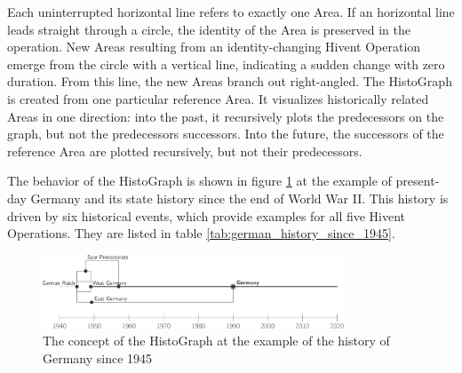 \vspace{-2em}

Each uninterrupted horizontal line refers to exactly one Area. If an horizontal line leads straight through a circle, the identity of the Area is preserved in the operation. New Areas resulting from an identity-changing Hivent Operation emerge from the circle with a vertical line, indicating a sudden change with zero duration. From this line, the new Areas branch out right-angled. The HistoGraph is created from one particular reference Area. It visualizes historically related Areas in one direction: into the past, it recursively plots the predecessors on the graph, but not the predecessors successors. Into the future, the successors of the reference Area are plotted recursively, but not their predecessors.

The behavior of the HistoGraph is shown in figure \ref{fig:example_germany} at the example of present-day Germany and its state history since the end of World War II. This history is driven by six historical events, which provide examples for all five Hivent Operations. They are listed in table \ref{tab:german_history_since_1945}.

\begin{figure}[ht]
  \vspace{0.5em}
  \centering
  \includegraphics[width=0.8\textwidth]{graphics/development/histograph/example_germany}
  \caption{The concept of the HistoGraph at the example of the history of Germany since 1945}
  \label{fig:example_germany}
\end{figure}


